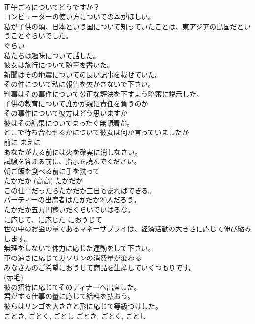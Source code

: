 \documentclass[8pt]{extreport}
\begin{document}
\begin{CJK}{UTF8}{min}
\\	正午ごろについてどうですか？  
\\	コンピューターの使い方についての本がほしい。  
\\	私が子供の頃、日本という国について知っていたことは、東アジアの島国だということぐらいでした。
\\	ぐらい 
\\	私たちは趣味について話した。   
\\	彼女は旅行について随筆を書いた。   
\\	新聞はその地震についての長い記事を載せていた。   
\\	その件について私に報告を欠かさないで下さい。   
\\	判事はその事件について公正な評決を下すよう陪審に説示した。   
\\	子供の教育について誰かが親に責任を負うのか   
\\	その事件について彼方はどう思いますか   
\\	彼はその結果についてまったく無頓着だ。   
\\	どこで待ち合わせるかについて彼女は何か言っていましたか  
\\	前に	まえに	
\\	あなたが去る前には火を確実に消しなさい。  
\\	試験を答える前に、指示を読んでください。  
\\	朝ご飯を食べる前に手を洗って  
\\	たかだか (高高)	たかだか	
\\	この仕事だったらたかだか三日もあればできる。  
\\	パーティーの出席者はたかだか20人だろう。  
\\	たかだか五万円稼いだくらいでいばるな。  
\\	に応じて、に応じた	におうじて	
\\	世の中のお金の量であるマネーサプライは、経済活動の大きさに応じて伸び縮みします。  
\\	無理をしないで体力に応じた運動をして下さい。  
\\	車の速さに応じてガソリンの消費量が変わる  
\\	みなさんのご希望におうじて商品を生産していくつもりです。  
\\	(赤毛)
\\	彼の招待に応じてそのディナーへ出席した。   
\\	君がする仕事の量に応じて給料を払おう。   
\\	彼らはリンゴを大きさと形に応じて等級づけした。   
\\	ごとき, ごとく, ごとし	ごとき, ごとく, ごとし	

\end{CJK}
\end{document}
